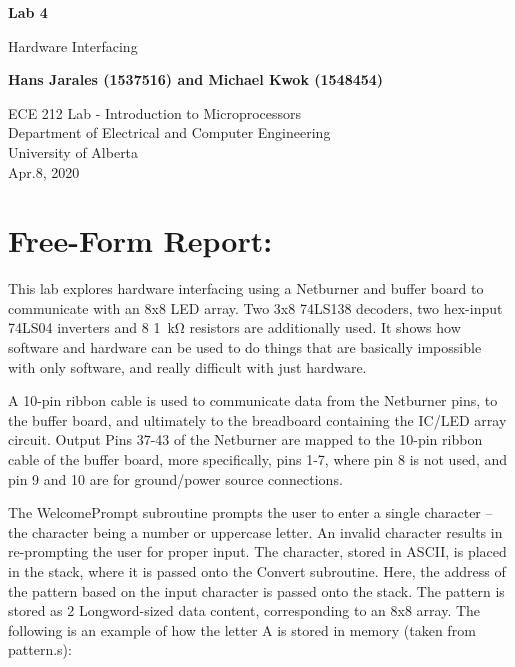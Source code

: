 \documentclass[12pt]{article}
\begin{document}
\begin{titlepage}
    \begin{center}
    \vspace*{1cm}
    
    \textbf{Lab 4}

    \vspace{0.5cm}

     Hardware Interfacing
    
    \vspace{1.5cm}

    \textbf{Hans Jarales (1537516) and Michael Kwok (1548454)}

    \vfill
            
    ECE 212 Lab - Introduction to Microprocessors\\
    Department of Electrical and Computer Engineering\\
    University of Alberta\\
    Apr.8, 2020   

   \end{center}
\end{titlepage}

\section{Free-Form Report:}
This lab explores hardware interfacing using a Netburner and buffer board to communicate with an 8x8 LED array. Two 3x8 74LS138 decoders, two hex-input 74LS04 inverters and 8 \SI{1}{\kilo\ohm} resistors are additionally used. It shows how software and hardware can be used to do things that are basically impossible with only software, and really difficult with just hardware.

A 10-pin ribbon cable is used to communicate data from the Netburner pins, to the buffer board, and ultimately to the breadboard containing the IC/LED array circuit. Output Pins 37-43 of the Netburner are mapped to the 10-pin ribbon cable of the buffer board, more specifically, pins 1-7, where pin 8 is not used, and pin 9 and 10 are for ground/power source connections.

The WelcomePrompt subroutine prompts the user to enter a single character -- the character being a number or uppercase letter. An invalid character results in re-prompting the user for proper input. The character, stored in ASCII, is placed in the stack, where it is passed onto the Convert subroutine. Here, the address of the pattern based on the input character is passed onto the stack. The pattern is stored as 2 Longword-sized data content, corresponding to an 8x8 array. The following is an example of how the letter A is stored in memory (taken from pattern.s):
\end{document}
